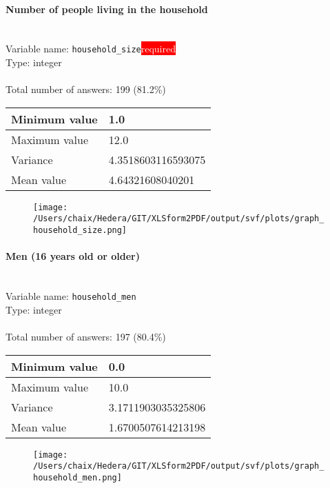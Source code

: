 \documentclass[11.5pt, a4paper]{scrartcl}
\begin{document}
\paragraph{Number of people living in the household}
\  \\Variable name: \texttt{household\_size}\hfill\colorbox{red}{\small{\textcolor{white}{required}}}\\
 Type: integer\\
\\Total number of answers: 199 (81.2\%)
\\[0.2em] \begin{tabular}{p{4cm}|p{8cm}}
Minimum value &1.0 \\
\hline
\cellcolor{mygray} Maximum value & \cellcolor{mygray}12.0 \\
\hline
Variance &4.3518603116593075 \\
\hline
\cellcolor{mygray} Mean value & \cellcolor{mygray}4.64321608040201 \\
\hline
\end{tabular}
\begin{figure}[H]
\centering
\texttt{[image: /Users/chaix/Hedera/GIT/XLSform2PDF/output/svf/plots/graph\_household\_size.png]}
\end{figure}
\paragraph{Men (16 years old or older) }
\  \\Variable name: \texttt{household\_men}\\
Type: integer\\
\\Total number of answers: 197 (80.4\%)
\\[0.2em] \begin{tabular}{p{4cm}|p{8cm}}
Minimum value &0.0 \\
\hline
\cellcolor{mygray} Maximum value & \cellcolor{mygray}10.0 \\
\hline
Variance &3.1711903035325806 \\
\hline
\cellcolor{mygray} Mean value & \cellcolor{mygray}1.6700507614213198 \\
\hline
\end{tabular}
\begin{figure}[H]
\centering
\texttt{[image: /Users/chaix/Hedera/GIT/XLSform2PDF/output/svf/plots/graph\_household\_men.png]}
\end{figure}
\end{document}
